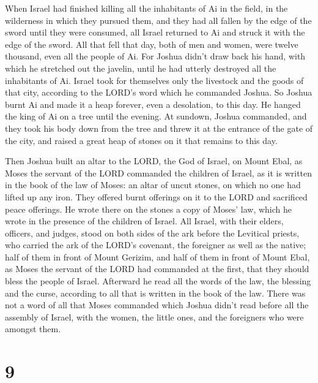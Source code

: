  When Israel had finished killing all the inhabitants of
Ai in the field, in the wilderness in which they pursued them, and they
had all fallen by the edge of the sword until they were consumed, all
Israel returned to Ai and struck it with the edge of the sword.
 All that fell that day, both of men and women, were
twelve thousand, even all the people of Ai.  For Joshua
didn't draw back his hand, with which he stretched out the javelin,
until he had utterly destroyed all the inhabitants of Ai.
 Israel took for themselves only the livestock and the
goods of that city, according to the LORD's word which he commanded
Joshua.  So Joshua burnt Ai and made it a heap forever,
even a desolation, to this day.  He hanged the king of Ai
on a tree until the evening. At sundown, Joshua commanded, and they took
his body down from the tree and threw it at the entrance of the gate of
the city, and raised a great heap of stones on it that remains to this
day.

 Then Joshua built an altar to the LORD, the God of
Israel, on Mount Ebal,  as Moses the servant of the LORD
commanded the children of Israel, as it is written in the book of the
law of Moses: an altar of uncut stones, on which no one had lifted up
any iron. They offered burnt offerings on it to the LORD and sacrificed
peace offerings.  He wrote there on the stones a copy of
Moses' law, which he wrote in the presence of the children of Israel.
 All Israel, with their elders, officers, and judges,
stood on both sides of the ark before the Levitical priests, who carried
the ark of the LORD's covenant, the foreigner as well as the native;
half of them in front of Mount Gerizim, and half of them in front of
Mount Ebal, as Moses the servant of the LORD had commanded at the first,
that they should bless the people of Israel.  Afterward
he read all the words of the law, the blessing and the curse, according
to all that is written in the book of the law.  There was
not a word of all that Moses commanded which Joshua didn't read before
all the assembly of Israel, with the women, the little ones, and the
foreigners who were amongst them.

\hypertarget{section-8}{%
\section{9}\label{section-8}}

